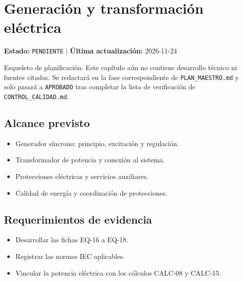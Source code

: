 \chapter{Generación y transformación eléctrica}
\label{cap:09}

\begin{cajaestado}
\textbf{Estado:} \texttt{PENDIENTE} \quad$|$\quad
\textbf{Última actualización:} 2026-11-24

Esqueleto de planificación. Este capítulo aún no contiene desarrollo técnico ni
fuentes citadas. Se redactará en la fase correspondiente de
\texttt{PLAN\_MAESTRO.md} y solo pasará a \texttt{APROBADO} tras completar
la lista de verificación de \texttt{CONTROL\_CALIDAD.md}.
\end{cajaestado}

\section{Alcance previsto}
\begin{itemize}
  \item Generador síncrono: principio, excitación y regulación.
  \item Transformador de potencia y conexión al sistema.
  \item Protecciones eléctricas y servicios auxiliares.
  \item Calidad de energía y coordinación de protecciones.
\end{itemize}

\section{Requerimientos de evidencia}
\begin{itemize}
  \item Desarrollar las fichas EQ-16 a EQ-18.
  \item Registrar las normas IEC aplicables.
  \item Vincular la potencia eléctrica con los cálculos CALC-08 y CALC-15.
\end{itemize}
